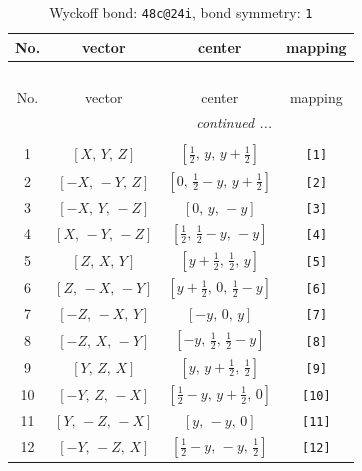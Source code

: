 \documentclass[fleqn,8pt]{jsarticle}
\begin{document}
\begin{longtable}{cccc}
\caption{Wyckoff bond: {\tt 48c@24i}, bond symmetry: {\tt 1}}
 \\
 \hline \hline
No. & vector & center & mapping \\ \hline \endfirsthead

\multicolumn{3}{l}{\tablename\ \thetable{}} \\
 \hline \hline
No. & vector & center & mapping \\ \hline \endhead

 \hline \hline
\multicolumn{3}{r}{\footnotesize\it continued ...} \\ \endfoot

 \hline \hline
\multicolumn{3}{r}{} \\ \endlastfoot

1 & $\left[ X,\, Y,\, Z \right]$ & $\left[ \frac{1}{2},\, y,\, y + \frac{1}{2} \right]$ & {\tt [1]} \\ \hline
2 & $\left[ - X,\, - Y,\, Z \right]$ & $\left[ 0,\, \frac{1}{2} - y,\, y + \frac{1}{2} \right]$ & {\tt [2]} \\ \hline
3 & $\left[ - X,\, Y,\, - Z \right]$ & $\left[ 0,\, y,\, - y \right]$ & {\tt [3]} \\ \hline
4 & $\left[ X,\, - Y,\, - Z \right]$ & $\left[ \frac{1}{2},\, \frac{1}{2} - y,\, - y \right]$ & {\tt [4]} \\ \hline
5 & $\left[ Z,\, X,\, Y \right]$ & $\left[ y + \frac{1}{2},\, \frac{1}{2},\, y \right]$ & {\tt [5]} \\ \hline
6 & $\left[ Z,\, - X,\, - Y \right]$ & $\left[ y + \frac{1}{2},\, 0,\, \frac{1}{2} - y \right]$ & {\tt [6]} \\ \hline
7 & $\left[ - Z,\, - X,\, Y \right]$ & $\left[ - y,\, 0,\, y \right]$ & {\tt [7]} \\ \hline
8 & $\left[ - Z,\, X,\, - Y \right]$ & $\left[ - y,\, \frac{1}{2},\, \frac{1}{2} - y \right]$ & {\tt [8]} \\ \hline
9 & $\left[ Y,\, Z,\, X \right]$ & $\left[ y,\, y + \frac{1}{2},\, \frac{1}{2} \right]$ & {\tt [9]} \\ \hline
10 & $\left[ - Y,\, Z,\, - X \right]$ & $\left[ \frac{1}{2} - y,\, y + \frac{1}{2},\, 0 \right]$ & {\tt [10]} \\ \hline
11 & $\left[ Y,\, - Z,\, - X \right]$ & $\left[ y,\, - y,\, 0 \right]$ & {\tt [11]} \\ \hline
12 & $\left[ - Y,\, - Z,\, X \right]$ & $\left[ \frac{1}{2} - y,\, - y,\, \frac{1}{2} \right]$ & {\tt [12]} \\ \hline

\end{longtable}
\end{document}
